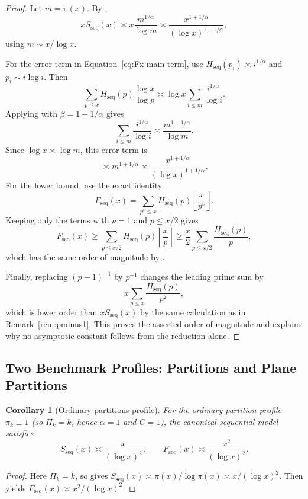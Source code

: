 \documentclass[11pt]{article}
\newtheorem{corollary}{Corollary}
\theoremstyle{definition}
\newcommand{\height}{H}
\begin{document}
\begin{proof}
Let $m=\pi(x)$.  By ,
\[
  xS_{\mathrm{seq}}(x)
  \asymp
  x\frac{m^{1/\alpha}}{\log m}
  \asymp
  \frac{x^{1+1/\alpha}}{(\log x)^{1+1/\alpha}},
\]
using $m\sim x/\log x$.

For the error term in Equation~\eqref{eq:Fx-main-term}, use
$\height_{\mathrm{seq}}(p_i)\asymp i^{1/\alpha}$ and
$p_i\sim i\log i$.  Then
\[
\sum_{p\le x}\height_{\mathrm{seq}}(p)\frac{\log x}{\log p}
\asymp
\log x\sum_{i\le m}\frac{i^{1/\alpha}}{\log i}.
\]
Applying  with $\beta=1+1/\alpha$ gives
\[
\sum_{i\le m}\frac{i^{1/\alpha}}{\log i}
\asymp
\frac{m^{1+1/\alpha}}{\log m}.
\]
Since $\log x\asymp\log m$, this error term is
\[
  \asymp m^{1+1/\alpha}
  \asymp
  \frac{x^{1+1/\alpha}}{(\log x)^{1+1/\alpha}}.
\]
For the lower bound, use the exact identity
\[
  F_{\mathrm{seq}}(x)
  =
  \sum_{p^\nu\le x}
  \height_{\mathrm{seq}}(p)
  \left\lfloor \frac{x}{p^\nu}\right\rfloor.
\]
Keeping only the terms with $\nu=1$ and $p\le x/2$ gives
\[
  F_{\mathrm{seq}}(x)
  \ge
  \sum_{p\le x/2}
  \height_{\mathrm{seq}}(p)
  \left\lfloor \frac{x}{p}\right\rfloor
  \ge
  \frac{x}{2}
  \sum_{p\le x/2}\frac{\height_{\mathrm{seq}}(p)}p,
\]
which has the same order of magnitude by .

Finally, replacing $(p-1)^{-1}$ by $p^{-1}$ changes the leading prime sum by
\[
  x\sum_{p\le x}\frac{\height_{\mathrm{seq}}(p)}{p^2},
\]
which is lower order than $xS_{\mathrm{seq}}(x)$ by the same calculation as in
Remark~\ref{rem:pminus1}.  This proves the asserted order of magnitude and
explains why no asymptotic constant follows from the reduction alone.
\end{proof}

\subsection{Two Benchmark Profiles: Partitions and Plane Partitions}

\begin{corollary}[Ordinary partitions profile]\label{cor:seq-partitions}
For the ordinary partition profile $\pi_k\equiv 1$ (so $\Pi_k=k$, hence $\alpha=1$ and $C=1$),
the canonical sequential model satisfies
\[
S_{\mathrm{seq}}(x)\asymp \frac{x}{(\log x)^2},
\qquad
F_{\mathrm{seq}}(x)\asymp \frac{x^2}{(\log x)^2}.
\]
\end{corollary}

\begin{proof}
Here $\Pi_k=k$, so  gives
$S_{\mathrm{seq}}(x)\asymp \pi(x)/\log\pi(x)\asymp x/(\log x)^2$.
Then  yields $F_{\mathrm{seq}}(x)\asymp x^2/(\log x)^2$.
\end{proof}
\end{document}
